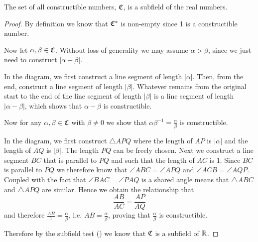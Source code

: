 \begin{theorem}\label{thrm-constructible-numbers-is-subfield-of-real-numbers}
    The set of all constructible numbers, $\mathfrak{C}$, is a subfield of the real numbers.
\end{theorem}
\begin{proof}
    By definition we know that $\mathfrak{C}^\ast$ is non-empty since 1 is a constructible number.

    Now let $\alpha, \beta \in \mathfrak{C}$. Without loss of generality we may assume $\alpha > \beta$, since we just need to construct $|\alpha - \beta|$.
    \begin{figure}[H]
        \centering
    \end{figure}
    In the diagram, we first construct a line segment of length $|\alpha|$. Then, from the end, construct a line segment of length $|\beta|$. Whatever remains from the original start to the end of the line segment of length $|\beta|$ is a line segment of length $|\alpha - \beta|$, which shows that $\alpha - \beta$ is constructible.

    Now for any $\alpha,\beta \in \mathfrak{C}$ with $\beta \neq 0$ we show that $\alpha\beta^{-1} = \frac\alpha\beta$ is constructible.
    \begin{figure}[H]
        \centering
    \end{figure}
    In the diagram, we first construct $\triangle APQ$ where the length of $AP$ is $|\alpha|$ and the length of $AQ$ is $|\beta|$. The length $PQ$ can be freely chosen. Next we construct a line segment $BC$ that is parallel to $PQ$ and such that the length of $AC$ is 1. Since $BC$ is parallel to $PQ$ we therefore know that $\angle ABC = \angle APQ$ and $\angle ACB = \angle AQP$. Coupled with the fact that $\angle BAC = \angle PAQ$ is a shared angle means that $\triangle ABC$ and $\triangle APQ$ are similar. Hence we obtain the relationship that
    \[
        \frac{AB}{AC} = \frac{AP}{AQ}
    \]
    and therefore $\frac{AB}{1} = \frac{\alpha}{\beta}$, i.e. $AB = \frac\alpha\beta$, proving that $\frac\alpha\beta$ is constructible.

    Therefore by the subfield test () we know that $\mathfrak{C}$ is a subfield of $\mathbb{R}$.
\end{proof}

